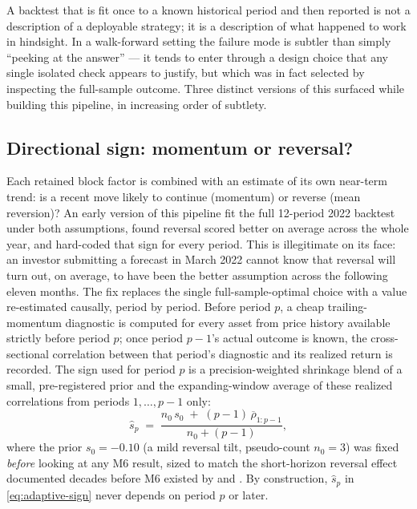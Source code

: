 \documentclass[11pt]{article}
\begin{document}
A backtest that is fit once to a known historical period and then
reported is not a description of a deployable strategy; it is a
description of what happened to work in hindsight. In a walk-forward
setting the failure mode is subtler than simply ``peeking at the
answer'' --- it tends to enter through a design choice that any single
isolated check appears to justify, but which was in fact selected by
inspecting the full-sample outcome. Three distinct versions of this
surfaced while building this pipeline, in increasing order of subtlety.

\subsection{Directional sign: momentum or reversal?}
\label{sec:momentum-sign}
Each retained block factor is combined with an estimate of its own
near-term trend: is a recent move likely to continue (momentum) or
reverse (mean reversion)? An early version of this pipeline fit the full
12-period 2022 backtest under both assumptions, found reversal scored
better on average across the whole year, and hard-coded that sign for
every period. This is illegitimate on its face: an investor submitting a
forecast in March 2022 cannot know that reversal will turn out, on
average, to have been the better assumption across the following eleven
months. The fix replaces the single full-sample-optimal choice with a
value re-estimated causally, period by period. Before period $p$, a
cheap trailing-momentum diagnostic is computed for every asset from price
history available strictly before period $p$; once period $p-1$'s actual
outcome is known, the cross-sectional correlation between that period's
diagnostic and its realized return is recorded. The sign used for period
$p$ is a precision-weighted shrinkage blend of a small, pre-registered
prior and the expanding-window average of these realized correlations
from periods $1,\dots,p-1$ only:
\begin{equation}
\hat{s}_p \;=\; \frac{n_0 \, s_0 \;+\; (p-1)\,\overline{\rho}_{1:p-1}}{n_0 + (p-1)},
\label{eq:adaptive-sign}
\end{equation}
where the prior $s_0=-0.10$ (a mild reversal tilt, pseudo-count $n_0=3$)
was fixed \emph{before} looking at any M6 result, sized to match the
short-horizon reversal effect documented decades before M6 existed by
\citet{jegadeesh1990} and \citet{lehmann1990}. By construction,
$\hat{s}_p$ in \eqref{eq:adaptive-sign} never depends on period $p$ or
later.
\end{document}
